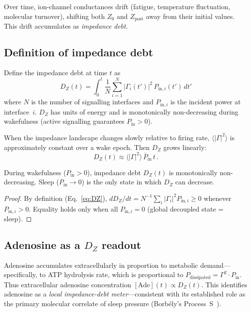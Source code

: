 \documentclass[aps,pre,twocolumn,superscriptaddress,floatfix]{revtex4-2}
\begin{document}
Over time, ion-channel conductances drift (fatigue,
temperature fluctuation, molecular turnover), shifting both
$Z_0$ and $Z_{\mathrm{post}}$ away from their initial values.
This drift accumulates as \emph{impedance debt}.


\subsection{Definition of impedance debt}
\label{sec:DZ-def}

Define the impedance debt at time $t$ as
\begin{equation}
  \boxed{\;
  D_Z(t) = \int_0^{t} \frac{1}{N}
    \sum_{i=1}^{N} |\Gamma_i(t')|^2\,
    P_{\mathrm{in},i}(t')\,dt'
  \;}
  \label{eq:DZ}
\end{equation}
where $N$ is the number of signalling interfaces and
$P_{\mathrm{in},i}$ is the incident power at interface~$i$.
$D_Z$ has units of energy and is monotonically
non-decreasing during wakefulness
(active signalling guarantees $P_{\mathrm{in}} > 0$).

When the impedance landscape changes slowly relative to
firing rate, $\langle|\Gamma|^2\rangle$ is approximately
constant over a wake epoch.
Then $D_Z$ grows linearly:
\begin{equation}
  D_Z(t) \approx \langle|\Gamma|^2\rangle\,
    \bar{P}_{\mathrm{in}}\,t\,.
  \label{eq:DZ-linear}
\end{equation}

\begin{proposition}
\label{prop:dz-monotone}
During wakefulness ($P_{\mathrm{in}} > 0$), impedance
debt $D_Z(t)$ is monotonically non-decreasing.
Sleep ($P_{\mathrm{in}} \to 0$) is the only state in
which $D_Z$ can decrease.
\end{proposition}

\begin{proof}
By definition (Eq.~\ref{eq:DZ}),
$dD_Z/dt = N^{-1} \sum_i |\Gamma_i|^2 P_{\mathrm{in},i}
\ge 0$ whenever $P_{\mathrm{in},i} > 0$.
Equality holds only when all $P_{\mathrm{in},i} = 0$
(global decoupled state = sleep).
\end{proof}


\subsection{Adenosine as a $D_Z$ readout}
\label{sec:adenosine}

Adenosine accumulates extracellularly in proportion to
metabolic demand---specifically, to ATP hydrolysis rate,
which is proportional to $P_{\mathrm{dissipated}} =
\Gamma^2 \cdot P_{\mathrm{in}}$.
Thus extracellular adenosine concentration
$[\mathrm{Ade}](t) \propto D_Z(t)$.
This identifies adenosine as a \emph{local impedance-debt
meter}---consistent with its established role as the
primary molecular correlate of sleep pressure
(Borb\'{e}ly's Process~S~\cite{Borbely1982}).
\end{document}
